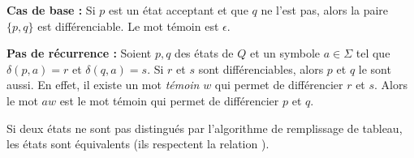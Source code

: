 \textbf{Cas de base :} Si $p$ est un état acceptant et que $q$ ne l'est pas, alors la paire $\{p,q\}$ est différenciable. Le mot témoin est $\epsilon$.

\textbf{Pas de récurrence : } Soient $p,q$ des états de $Q$ et un symbole $a \in \Sigma$ tel que $\delta(p,a)=r$ et $\delta(q,a)=s$. Si $r$ et $s$ sont différenciables, alors $p$ et $q$ le sont aussi. En effet, il existe un mot \emph{témoin} $w$ qui permet de différencier $r$ et $s$. Alors le mot $aw$ est le mot témoin qui permet de différencier $p$ et $q$.

\begin{theorem}
 Si deux états ne sont pas distingués par l'algorithme de remplissage de tableau, les états sont équivalents (ils respectent la relation \rm).
\end{theorem}

